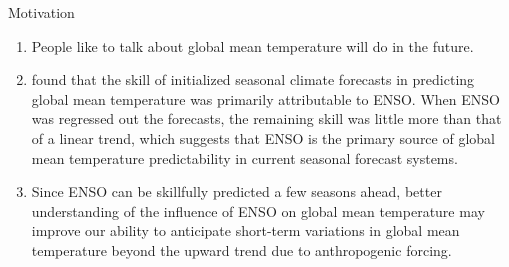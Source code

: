 \documentclass[aspectratio=169,xcolor=dvipsnames]{beamer}
\begin{document}
\begin{frame}{Motivation}
  \begin{enumerate}

  \item People like to talk about global mean temperature will do in
    the future.
    
  \item \citet{Tippett2024trends} found that the skill of initialized
    seasonal climate forecasts in predicting global mean temperature
    was primarily attributable to ENSO. When ENSO was regressed out
    the forecasts, the remaining skill was little more than that of a
    linear trend, which suggests that ENSO is the primary source of
    global mean temperature predictability in current seasonal
    forecast systems.

  \item Since ENSO can be skillfully predicted a few seasons ahead,
    better understanding of the influence of ENSO on global mean
    temperature may improve our ability to anticipate short-term
    variations in global mean temperature beyond the upward trend due
    to anthropogenic forcing.

  \end{enumerate}
\end{frame}
\end{document}
